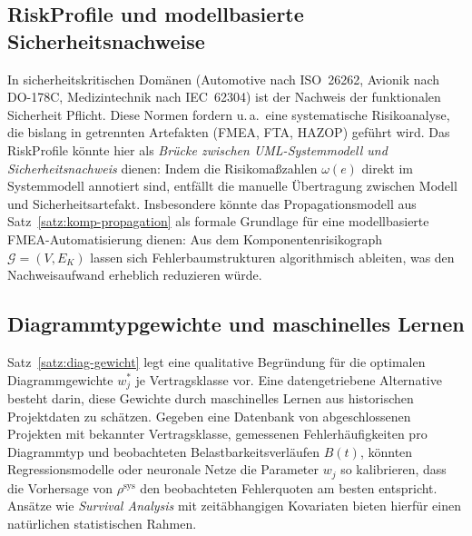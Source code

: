 ﻿\documentclass[a4paper,12pt]{article}
\theoremstyle{definition}
\begin{document}
\subsection{\textsf{RiskProfile} und modellbasierte Sicherheitsnachweise}

In sicherheitskritischen Dom\"anen (Automotive nach ISO~26262, Avionik nach
DO-178C, Medizintechnik nach IEC~62304) ist der Nachweis der funktionalen Sicherheit
Pflicht. Diese Normen fordern u.\,a.\ eine systematische Risikoanalyse, die bislang
in getrennten Artefakten (FMEA, FTA, HAZOP) gef\"uhrt wird. Das \textsf{RiskProfile}
k\"onnte hier als \emph{Br\"ucke zwischen UML-Systemmodell und Sicherheitsnachweis}
dienen: Indem die Risikoma\ss{}zahlen $\omega(e)$ direkt im Systemmodell annotiert
sind, entf\"allt die manuelle \"Ubertragung zwischen Modell und Sicherheitsartefakt.
Insbesondere k\"onnte das Propagationsmodell aus Satz~\ref{satz:komp-propagation}
als formale Grundlage f\"ur eine modellbasierte FMEA-Automatisierung dienen: Aus
dem Komponentenrisikograph $\mathcal{G} = (V, E_K)$ lassen sich Fehlerbaumstrukturen
algorithmisch ableiten, was den Nachweisaufwand erheblich reduzieren w\"urde.

\subsection{Diagrammtypgewichte und maschinelles Lernen}

Satz~\ref{satz:diag-gewicht} legt eine qualitative Begr\"undung f\"ur die optimalen
Diagrammgewichte $w_j^*$ je Vertragsklasse vor. Eine datengetriebene Alternative
besteht darin, diese Gewichte durch maschinelles Lernen aus historischen Projektdaten
zu sch\"atzen. Gegeben eine Datenbank von abgeschlossenen Projekten mit bekannter
Vertragsklasse, gemessenen Fehlerh\"aufigkeiten pro Diagrammtyp und beobachteten
Belastbarkeitsverl\"aufen $B(t)$, k\"onnten Regressionsmodelle oder neuronale Netze
die Parameter $w_j$ so kalibrieren, dass die Vorhersage von $\rho^{\mathrm{sys}}$
den beobachteten Fehlerquoten am besten entspricht. Ans\"atze wie
\emph{Survival Analysis} mit zeit\"abhangigen Kovariaten \cite{cox1972} bieten
hierf\"ur einen nat\"urlichen statistischen Rahmen.

\end{document}
